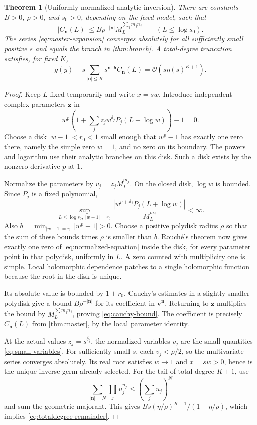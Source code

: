 \documentclass[11pt,a4paper]{article}
\numberwithin{equation}{section}
\newtheorem{theorem}{Theorem}[section]
\theoremstyle{definition}
\newcommand{\OO}{\mathcal O}
\newcommand{\nn}{\boldsymbol n}
\newcommand{\del}{\boldsymbol\delta}
\begin{document}
\begin{theorem}[Uniformly normalized analytic inversion]\label{thm:convergence}
There are constants $B>0$, $\rho>0$, and $s_0>0$, depending on the fixed
model, such that
\begin{equation}\label{eq:cauchy-bound}
 |C_{\nn}(L)|\le B\rho^{-|\nn|}M_L^{\sum_jm_jn_j}
 \qquad(L\le\log s_0).
\end{equation}
The series \eqref{eq:master-expansion} converges absolutely for all
sufficiently small positive $s$ and equals the branch in
\cref{thm:branch}. A total-degree truncation satisfies, for fixed $K$,
\begin{equation}\label{eq:totaldegree-remainder}
 g(y)-s\sum_{|\nn|\le K}s^{\nn\cdot\del}C_{\nn}(L)
 =\OO\!\left(s\eta(s)^{K+1}\right).
\end{equation}
\end{theorem}
\begin{proof}
Keep $L$ fixed temporarily and write $x=s w$. Introduce independent
complex parameters $\boldsymbol z$ in
\begin{equation}\label{eq:normalized-equation}
 w^p\left(1+\sum_j z_j w^{\delta_j}P_j(L+\log w)\right)-1=0.
\end{equation}
Choose a disk $|w-1|<r_0<1$ small enough that $w^p-1$ has exactly one zero
there, namely the simple zero $w=1$, and no zero on its boundary. The powers
and logarithm use their analytic branches on this disk. Such a disk exists
by the nonzero derivative $p$ at $1$.

Normalize the parameters by $v_j=z_jM_L^{m_j}$. On the closed disk,
$\log w$ is bounded. Since $P_j$ is a fixed polynomial,
\[
 \sup_{L\le\log s_0,\ |w-1|=r_0}
 \frac{|w^{p+\delta_j}P_j(L+\log w)|}{M_L^{m_j}}<\infty.
\]
Also $b=\min_{|w-1|=r_0}|w^p-1|>0$. Choose a positive polydisk radius
$\rho$ so that the sum of these bounds times $\rho$ is smaller than $b$.
Rouch\'e's theorem now gives exactly one zero of
\eqref{eq:normalized-equation} inside the disk, for every parameter point
in that polydisk, uniformly in $L$. A zero counted with multiplicity one
is simple. Local holomorphic dependence patches to a single holomorphic
function because the root in the disk is unique.

Its absolute value is bounded by $1+r_0$. Cauchy's estimates in a slightly
smaller polydisk give a bound $B\rho^{-|\nn|}$ for its coefficient in
$\boldsymbol v^{\nn}$. Returning to $\boldsymbol z$ multiplies the bound by
$M_L^{\sum m_jn_j}$, proving \eqref{eq:cauchy-bound}. The coefficient is
precisely $C_{\nn}(L)$ from \cref{thm:master}, by the local parameter identity.

At the actual values $z_j=s^{\delta_j}$, the normalized variables $v_j$
are the small quantities \eqref{eq:small-variables}. For sufficiently
small $s$, each $v_j<\rho/2$, so the multivariate series converges
absolutely. Its real root satisfies $w\to1$ and $x=s w>0$, hence is the
unique inverse germ already selected. For the tail of total degree $K+1$,
use
\[
 \sum_{|\nn|=N}\prod_j u_j^{n_j}
 \le\left(\sum_j u_j\right)^N
\]
and sum the geometric majorant. This gives
$B s(\eta/\rho)^{K+1}/(1-\eta/\rho)$, which implies
\eqref{eq:totaldegree-remainder}.
\end{proof}
\end{document}
